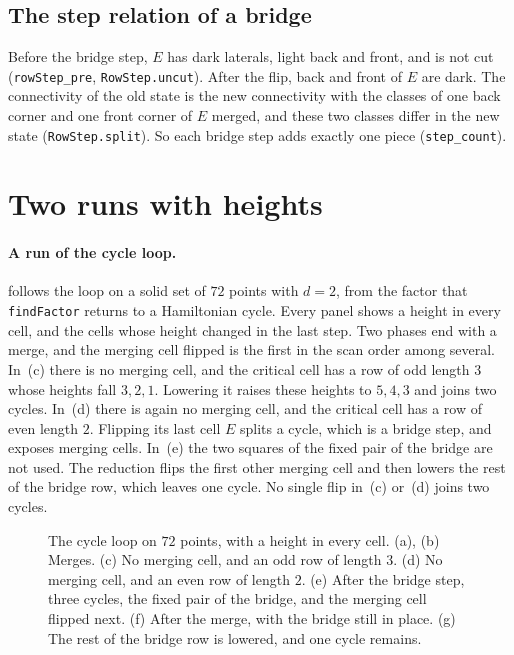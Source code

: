 \documentclass[11pt]{article}
\theoremstyle{plain}
\theoremstyle{definition}
\theoremstyle{remark}
\newcommand{\lean}[1]{\texttt{#1}}
\begin{document}
\subsection{The step relation of a bridge}
\label{app:step}

Before the bridge step, $E$ has dark laterals, light back and front, and is not cut
(\lean{rowStep\_pre}, \lean{RowStep.uncut}).
After the flip, back and front of $E$ are dark.
The connectivity of the old state is the new connectivity with the classes of one back corner and
one front corner of $E$ merged, and these two classes differ in the new state
(\lean{RowStep.split}).
So each bridge step adds exactly one piece (\lean{step\_count}).

\section{Two runs with heights}
\label{app:runs}

\paragraph{A run of the cycle loop.}
 follows the loop on a solid set of $72$ points with $d=2$, from the factor that
\lean{findFactor} returns to a Hamiltonian cycle.
Every panel shows a height in every cell, and the cells whose height changed in the last step.
Two phases end with a merge, and the merging cell flipped is the first in the scan order among
several.
In~(c) there is no merging cell, and the critical cell has a row of odd length $3$ whose heights
fall $3,2,1$.
Lowering it raises these heights to $5,4,3$ and joins two cycles.
In~(d) there is again no merging cell, and the critical cell has a row of even length $2$.
Flipping its last cell $E$ splits a cycle, which is a bridge step, and exposes merging cells.
In~(e) the two squares of the fixed pair of the bridge are not used.
The reduction flips the first other merging cell and then lowers the rest of the bridge row,
which leaves one cycle.
No single flip in~(c) or~(d) joins two cycles.

\begin{figure}[p]
\centering

\caption{The cycle loop on $72$ points, with a height in every cell.
(a), (b) Merges.
(c) No merging cell, and an odd row of length $3$.
(d) No merging cell, and an even row of length $2$.
(e) After the bridge step, three cycles, the fixed pair of the bridge, and the merging cell
flipped next.
(f) After the merge, with the bridge still in place.
(g) The rest of the bridge row is lowered, and one cycle remains.}
\label{fig:run72}
\end{figure}
\end{document}

